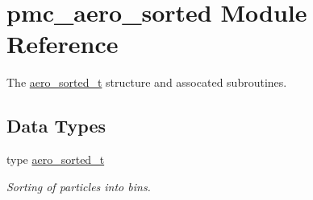\hypertarget{namespacepmc__aero__sorted}{}\section{pmc\+\_\+aero\+\_\+sorted Module Reference}
\label{namespacepmc__aero__sorted}


The \mbox{\hyperlink{structpmc__aero__sorted_1_1aero__sorted__t}{aero\+\_\+sorted\+\_\+t}} structure and assocated subroutines.  


\subsection*{Data Types}
\begin{DoxyCompactItemize}
\item 
type \mbox{\hyperlink{structpmc__aero__sorted_1_1aero__sorted__t}{aero\+\_\+sorted\+\_\+t}}
\begin{DoxyCompactList}\small\item\em Sorting of particles into bins. \end{DoxyCompactList}\end{DoxyCompactItemize}
